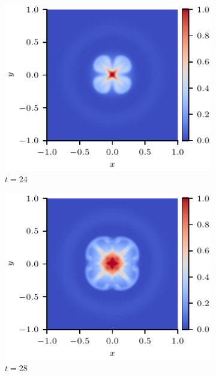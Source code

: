 \documentclass[12pt]{article}
\begin{document}
\begin{figure}[t]
  \centering
    \begin{subfigure}{0.32\textwidth}
      \includegraphics[width=\linewidth]{swi-3_pressure_12.pdf}
      \caption{$t=24$}
      \label{fig:swi-3_pressure_12}
    \end{subfigure}
    \hfill
    \begin{subfigure}{0.32\textwidth}
      \includegraphics[width=\linewidth]{swi-3_pressure_14.pdf}
      \caption{$t=28$}
      \label{fig:swi-3_pressure_14}
    \end{subfigure}
    \hfill
    \begin{subfigure}{0.32\textwidth}

\end{subfigure}
\end{figure}
\end{document}
